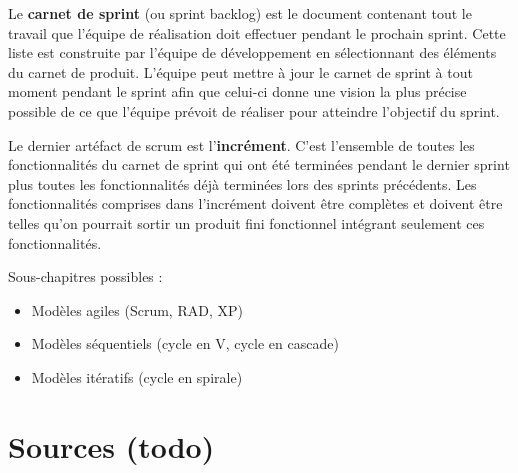 \documentclass[12pt]{report}
\begin{document}
Le \textbf{carnet de sprint} (ou sprint backlog) est le document contenant tout le travail que l'équipe de réalisation doit effectuer pendant le prochain sprint.
Cette liste est construite par l'équipe de développement en sélectionnant des éléments du carnet de produit. L'équipe peut mettre à jour le carnet de sprint à tout moment pendant le sprint afin que celui-ci donne une vision la plus précise possible de ce que l'équipe prévoit de réaliser pour atteindre l'objectif du sprint.

Le dernier artéfact de scrum est l'\textbf{incrément}. C'est l'ensemble de toutes les fonctionnalités du carnet de sprint qui ont été terminées pendant le dernier sprint plus toutes les fonctionnalités déjà terminées lors des sprints précédents. Les fonctionnalités comprises dans l'incrément doivent être complètes et doivent être telles qu'on pourrait sortir un produit fini fonctionnel intégrant seulement ces fonctionnalités.

Sous-chapitres possibles :
\begin{itemize}
\item Modèles agiles (Scrum, RAD, XP)
\item Modèles séquentiels (cycle en V, cycle en cascade)
\item Modèles itératifs (cycle en spirale)
\end{itemize}

\section{Sources (todo)}
\end{document}
